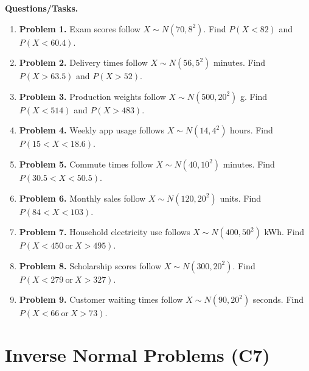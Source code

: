 	\textbf{Questions/Tasks.}
	\begin{enumerate}
	\item \textbf{Problem 1.} Exam scores follow \(X\sim N(70,8^2)\). Find \(P(X<82)\) and \(P(X<60.4)\).
	
	\item \textbf{Problem 2.} Delivery times follow \(X\sim N(56,5^2)\) minutes. Find \(P(X>63.5)\) and \(P(X>52)\).
	
	\item \textbf{Problem 3.} Production weights follow \(X\sim N(500,20^2)\) g. Find \(P(X<514)\) and \(P(X>483)\).
	
	\item \textbf{Problem 4.} Weekly app usage follows \(X\sim N(14,4^2)\) hours. Find \(P(15<X<18.6)\).
	
	\item \textbf{Problem 5.} Commute times follow \(X\sim N(40,10^2)\) minutes. Find \(P(30.5<X<50.5)\).
	
	\item \textbf{Problem 6.} Monthly sales follow \(X\sim N(120,20^2)\) units. Find \(P(84<X<103)\).
	
	\item \textbf{Problem 7.} Household electricity use follows \(X\sim N(400,50^2)\) kWh. Find \(P(X<450\ \text{or}\ X>495)\).
	
	\item \textbf{Problem 8.} Scholarship scores follow \(X\sim N(300,20^2)\). Find \(P(X<279\ \text{or}\ X>327)\).
	
	\item \textbf{Problem 9.} Customer waiting times follow \(X\sim N(90,20^2)\) seconds. Find \(P(X<66\ \text{or}\ X>73)\).
	\end{enumerate}
	
	\section{Inverse Normal Problems (C7)}
	\label{sec:inverse-normal-problems-c7}
	
